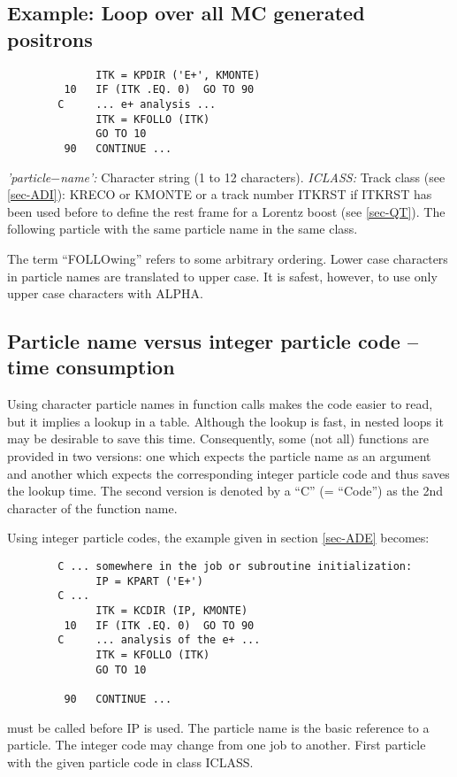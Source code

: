 \subsection{\label{sec-ADE}Example: Loop over all MC generated positrons}
\par
\begin{verbatim}
              ITK = KPDIR ('E+', KMONTE)
         10   IF (ITK .EQ. 0)  GO TO 90
        C     ... e+ analysis ...
              ITK = KFOLLO (ITK)
              GO TO 10
         90   CONTINUE ...
\end{verbatim}
\begin{indentlist}{ 3.25cm}{ 3.50cm}
{\it 'particle$-$name':} Character string (1 to 12 characters).
{\it ICLASS:} Track class (see \ref{sec-ADI}): KRECO
or KMONTE or a track number
ITKRST if ITKRST has been used before to define the rest frame for
a
Lorentz boost (see \ref{sec-QT}).
The following particle with the same particle name in the
same class.
 
The term ``FOLLOwing'' refers to some arbitrary ordering.
Lower case characters in particle names are translated to
upper case. It is safest, however, to use only
upper case characters with ALPHA.
\end{indentlist}
\subsection{\label{sec-ADT}Particle name versus integer particle
code -- time consumption}
\par
Using character particle names in function calls makes the code easier
to read, but it implies a
lookup in a table. Although the lookup is fast,
in nested loops it may be
desirable to save this time. Consequently, some (not all)
functions are provided in two versions: one which expects the particle
name as an argument and another which expects the corresponding
integer particle code and thus saves the lookup time. The second version
is denoted by a ``C'' (= ``Code'') as the 2nd character of the function
name.
\par Using integer particle codes,
the example given in section \ref{sec-ADE} becomes:
\begin{verbatim}
        C ... somewhere in the job or subroutine initialization:
              IP = KPART ('E+')
        C ...
              ITK = KCDIR (IP, KMONTE)
         10   IF (ITK .EQ. 0)  GO TO 90
        C     ... analysis of the e+ ...
              ITK = KFOLLO (ITK)
              GO TO 10
 
         90   CONTINUE ...
\end{verbatim}
\begin{indentlist}{ 5.00cm}{ 5.25cm}
must be called before IP is used. The particle name is the basic
reference to a particle. The integer
code may change from one job to another.
First particle with the given particle code in class ICLASS.
\end{indentlist}
 
